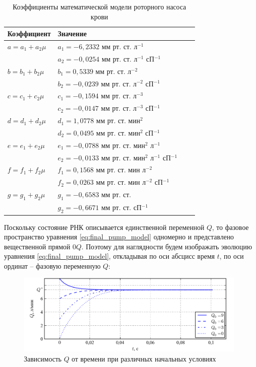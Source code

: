 \begin{table} [htbp]%
    \centering
	\caption{Коэффициенты математической модели роторного насоса крови}%
	\label{tbl:pump_model_coefficients}%
    \renewcommand{\arraystretch}{1.5} 
	\begin{tabular}{@{}@{\extracolsep{20pt}}llll@{}} 
        \toprule     %
    	Коэффициент & Значение \\
        \midrule %
    	$a = a_1 + a_2\mu$ & $a_1 = -6,2332$ мм рт. ст. л$^{-1}$ \\
		 & $a_2 = -0,0254$ мм рт. ст. л$^{-1}$ сП$^{-1}$  \\
		$b = b_1 + b_2\mu$ & $b_1 = 0,5339$ мм рт. ст. л$^{-2}$  \\
		 & $b_2 = -0,0239$ мм рт. ст. л$^{-2}$ сП$^{-1}$  \\
    	$c = c_1 + c_2\mu$ & $c_1 = -0,1594$ мм рт. ст. л$^{-3}$ \\
		 & $c_2 = -0,0147$ мм рт. ст. л$^{-3}$ сП$^{-1}$  \\
		$d = d_1 + d_2\mu$ & $d_1 = 1,0778$ мм рт. ст. мин$^{2}$  \\
		 & $d_2 = 0,0495$ мм рт. ст. мин$^{2}$ сП$^{-1}$  \\
    	$e = e_1 + e_2\mu$ & $e_1 = -0,0788$ мм рт. ст. мин$^2$ л$^{-1}$ \\
		 & $e_2 = -0,0133$ мм рт. ст. мин$^2$ л$^{-1}$ сП$^{-1}$  \\
		$f = f_1 + f_2\mu$ & $f_1 = 0,1568$ мм рт. ст. мин л$^{-2}$ \\
		 & $f_2 = 0,0263$ мм рт. ст. мин л$^{-2}$ сП$^{-1}$ \\
    	$g = g_1 + g_2\mu$ & $g_1 = -0,6583$ мм рт. ст. \\
		 & $g_2 = -0,6671$ мм рт. ст. сП$^{-1}$  \\
        \bottomrule %
	\end{tabular}%
\end{table}

Поскольку состояние РНК описывается единственной переменной $Q$, то фазовое пространство уравнения \eqref{eq:final_pump_model} одномерно и представлено вещественной прямой $0Q$. Поэтому для наглядности будем изображать эволюцию уравнения \eqref{eq:final_pump_model}, откладывая по оси абсцисс время $t$, по оси ординат -- фазовую переменную $Q$:

\begin{figure}[ht] 
  \center
  \includegraphics [scale=1.0] {../images/c2_dynamic_model_solution_zero}
  \caption{Зависимость $Q$ от времени при различных начальных условиях}
  \label{img:final_pump_model_solution_zero}  
\end{figure}

